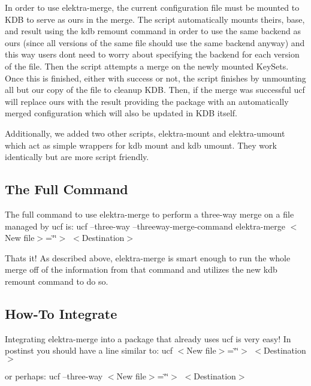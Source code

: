 In order to use {\ttfamily elektra-\/merge}, the current configuration file must be mounted to K\+DB to serve as {\ttfamily ours} in the merge. The script automatically mounts {\ttfamily theirs}, {\ttfamily base}, and {\ttfamily result} using the {\ttfamily kdb remount} command in order to use the same backend as {\ttfamily ours} (since all versions of the same file should use the same backend anyway) and this way users don\textquotesingle{}t need to worry about specifying the backend for each version of the file. Then the script attempts a merge on the newly mounted Key\+Sets. Once this is finished, either with success or not, the script finishes by unmounting all but {\ttfamily our} copy of the file to cleanup K\+DB. Then, if the merge was successful ucf will replace {\ttfamily ours} with the result providing the package with an automatically merged configuration which will also be updated in K\+DB itself.

Additionally, we added two other scripts, {\ttfamily elektra-\/mount} and {\ttfamily elektra-\/umount} which act as simple wrappers for {\ttfamily kdb mount} and {\ttfamily kdb umount}. They work identically but are more script friendly.

\subsection*{The Full Command}

The full command to use {\ttfamily elektra-\/merge} to perform a three-\/way merge on a file managed by ucf is\+: ucf --three-\/way --threeway-\/merge-\/command elektra-\/merge $<$\+New file$>$=\char`\"{}\char`\"{}$>$ $<$\+Destination$>$

That\textquotesingle{}s it! As described above, {\ttfamily elektra-\/merge} is smart enough to run the whole merge off of the information from that command and utilizes the new {\ttfamily kdb remount} command to do so.

\subsection*{How-\/\+To Integrate}

Integrating {\ttfamily elektra-\/merge} into a package that already uses ucf is very easy! In {\ttfamily postinst} you should have a line similar to\+: ucf $<$\+New file$>$=\char`\"{}\char`\"{}$>$ $<$\+Destination$>$

or perhaps\+: ucf --three-\/way $<$\+New file$>$=\char`\"{}\char`\"{}$>$ $<$\+Destination$>$

